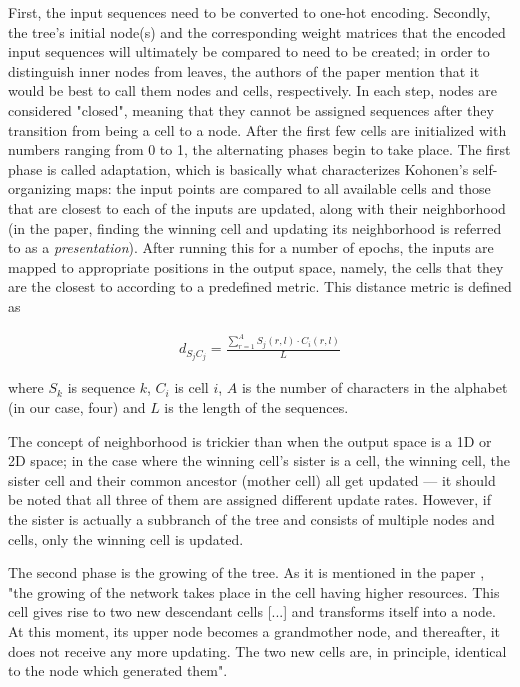 \documentclass[11pt,twocolumn]{article}
\begin{document}
First, the input sequences need to be converted to one-hot encoding. Secondly, the tree's initial node(s) and the corresponding weight matrices that the encoded input sequences will ultimately be compared to need to be created; in order to distinguish inner nodes from leaves, the authors of the paper mention that it would be best to call them nodes and cells, respectively. In each step, nodes are considered "closed", meaning that they cannot be assigned sequences after they transition from being a cell to a node. After the first few cells are initialized with numbers ranging from 0 to 1, the alternating phases begin to take place. The first phase is called adaptation, which is basically what characterizes Kohonen's self-organizing maps: the input points are compared to all available cells and those that are closest to each of the inputs are updated, along with their neighborhood (in the paper, finding the winning cell and updating its neighborhood is referred to as a \textit{presentation}). After running this for a number of epochs, the inputs are mapped to appropriate positions in the output space, namely, the cells that they are the closest to according to a predefined metric. This distance metric is defined as

\begin{align}
d_{S_j C_j} = \frac{\sum_{r = 1}^A S_j(r, l) \cdot C_i(r, l)}{L}
\end{align}

where $S_k$ is sequence $k$, $C_i$ is cell $i$, $A$ is the number of characters in the alphabet (in our case, four) and $L$ is the length of the sequences.

The concept of neighborhood is trickier than when the output space is a 1D or 2D space; in the case where the winning cell's sister is a cell, the winning cell, the sister cell and their common ancestor (mother cell) all get updated — it should be noted that all three of them are assigned different update rates. However, if the sister is actually a subbranch of the tree and consists of multiple nodes and cells, only the winning cell is updated.

The second phase is the growing of the tree. As it is mentioned in the paper \cite{Dopazo1997}, "the growing of the network takes place in the cell having higher resources. This cell gives rise to two new descendant cells [...] and transforms itself into a node. At this moment, its upper node becomes a grandmother node, and thereafter, it does not receive any more updating. The two new cells are, in principle, identical to the node which generated them".
\end{document}

